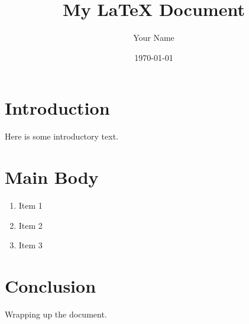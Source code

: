 \documentclass{article}
\begin{document}
\title{My LaTeX Document}
\author{Your Name}
\date{\today}

\maketitle

\section{Introduction}
Here is some introductory text.

\section{Main Body}
\begin{enumerate}
    \item Item 1
    \item Item 2
    \item Item 3
\end{enumerate}

\lipsum[1-20] %

\section{Conclusion}
Wrapping up the document.
\end{document}
